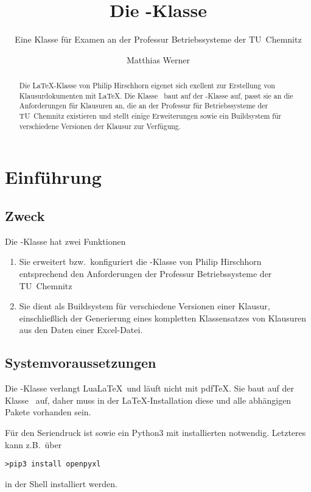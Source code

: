 \documentclass[
load=osgexam,
babel=ngerman
]{skdoc}
\author{Matthias Werner}
\title{Die \thepkg-Klasse}
\subtitle{Eine Klasse für Examen an der Professur Betriebssysteme der TU~Chemnitz}
\begin{document}
\maketitle
\begin{abstract}
    Die \LaTeX-Klasse  von \textsf{Philip Hirschhorn} eigenet sich exellent zur Erstellung von
    Klausurdokumenten mit \LaTeX. Die Klasse \thepkg\  baut auf der -Klasse auf, passt sie an die
    Anforderungen für Klausuren an, die an der Professur für Betriebssysteme der TU~Chemnitz existieren und stellt
    einige Erweiterungen sowie ein Buildsystem für verschiedene Versionen der Klausur zur Verfügung.
\end{abstract}

\tableofcontents\clearpage


\section{Einführung}
\subsection{Zweck}
Die -Klasse hat zwei Funktionen
\begin{enumerate}
  \item Sie erweitert bzw.\ konfiguriert die -Klasse von \textsf{Philip Hirschhorn} entsprechend den
    Anforderungen der Professur Betriebssysteme der TU~Chemnitz
  \item Sie dient als Buildsystem für verschiedene Versionen einer Klausur, einschließlich der Generierung eines
    kompletten Klassensatzes von Klausuren aus den Daten einer Excel-Datei.
\end{enumerate}
\subsection{Systemvoraussetzungen}
Die \thepkg-Klasse verlangt Lua\LaTeX\ und läuft nicht mit pdfTeX. Sie baut auf der Klasse \ auf, daher muss
in der \LaTeX-Installation diese und alle abhängigen Pakete vorhanden sein.
 
Für den Seriendruck ist  sowie ein Python3 mit installierten
 notwendig. Letzteres kann z.\;B.\ über

\begin{verbatim}
>pip3 install openpyxl
\end{verbatim}
in der Shell installiert werden.
\end{document}
